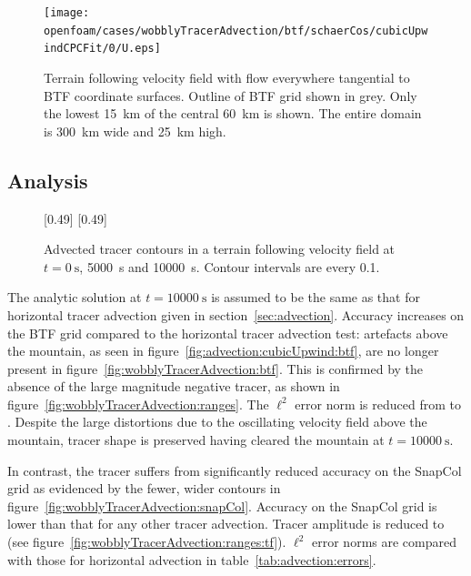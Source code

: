 \begin{figure}
	\centering
	\texttt{[image: openfoam/cases/wobblyTracerAdvection/btf/schaerCos/cubicUpwindCPCFit/0/U.eps]}
%
	\caption{Terrain following velocity field with flow everywhere tangential to BTF coordinate surfaces.  Outline of BTF grid shown in grey.  Only the lowest \SI{15}{\kilo\meter} of the central \SI{60}{\kilo\meter} is shown.  The entire domain is \SI{300}{\kilo\meter} wide and \SI{25}{\kilo\meter} high.}
	\label{fig:wobblyTracer:u}
\end{figure}

\subsection{Analysis}

\begin{figure}
	\captionsetup[subfigure]{position=b}
	\centering
	[0.49\textwidth]{}
	\hfill
	[0.49\textwidth]{}
%
	\caption{Advected tracer contours in a terrain following velocity field at $t = \SI{0}{\second}$, \SI{5000}{\second} and \SI{10000}{\second}.  Contour intervals are every 0.1.}
\end{figure}

The analytic solution at $t = \SI{10000}{\second}$ is assumed to be the same as that for horizontal tracer advection given in section~\ref{sec:advection}.
Accuracy increases on the BTF grid compared to the horizontal tracer advection test: artefacts above the mountain, as seen in figure~\ref{fig:advection:cubicUpwind:btf}, are no longer present in figure~\ref{fig:wobblyTracerAdvection:btf}.  This is confirmed by the absence of the large magnitude negative tracer, as shown in figure~\ref{fig:wobblyTracerAdvection:ranges}.  The $\ell^2$ error norm is reduced from  to \unskip.  Despite the large distortions due to the oscillating velocity field above the mountain, tracer shape is preserved having cleared the mountain at $t = \SI{10000}{\second}$.

In contrast, the tracer suffers from significantly reduced accuracy on the SnapCol grid as evidenced by the fewer, wider contours in figure~\ref{fig:wobblyTracerAdvection:snapCol}.  Accuracy on the SnapCol grid is lower than that for any other tracer advection.  Tracer amplitude is reduced to  (see figure~\ref{fig:wobblyTracerAdvection:ranges:tf}).  $\ell^2$ error norms are compared with those for horizontal advection in table~\ref{tab:advection:errors}.

